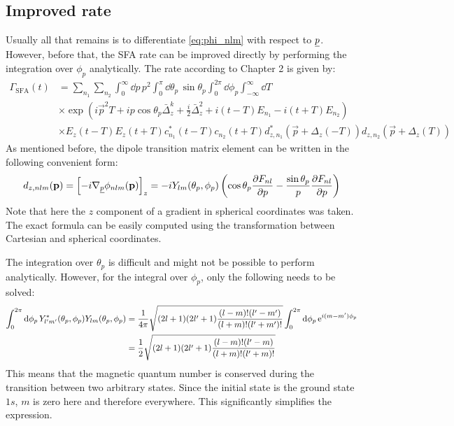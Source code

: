 \subsection*{Improved rate}
Usually all that remains is to differentiate \eqref{eq:phi_nlm} with respect to $\underline{p}$.
However, before that, the SFA rate can be improved directly by performing the integration over $\phi_p$ analytically.
The rate according to Chapter 2 is given by:
\begin{align*}
    \Gamma_{\mathrm{SFA}}(t) &= \sum_{n_1}\sum_{n_2} \int_0^{\infty} \dd p\,p^2\int_0^{\pi} \dd\theta_p\,\sin\theta_p \int_0^{2\pi}\dd \phi_p\int_{-\infty}^{\infty} \dd T\\
    &\times \exp\left(i\vec{p}^2T + ip\cos\theta_p\bar{\Delta}_z^k +  \frac{i}{2}\bar{\Delta}_z^2  + i(t-T)E_{n_1}-i(t+T)E_{n_2}\right)\\
    &\times E_z(t-T) E_z(t+T)c_{n_1}^*(t-T)c_{n_2}(t+T) d_{z,n_1}^*(\vec{p}+\Delta_z(-T))d_{z,n_2}(\vec{p}+\Delta_z(T))
\end{align*}
As mentioned before, the dipole transition matrix element can be written in the following convenient form:
\begin{equation*}
    d_{z,nlm}(\mathbf{p}) = \left[-i\nabla_{\underline{p}}\phi_{nlm}(\mathbf{p})\right]_z = -iY_{lm}(\theta_p, \phi_p)\left(\cos\theta_p\frac{\partial F_{nl}}{\partial p}-\frac{\sin\theta_p}{p}\frac{\partial F_{nl}}{\partial p}\right)
\end{equation*}
Note that here the $z$ component of a gradient in spherical coordinates was taken. The exact formula can be easily computed using the transformation between Cartesian and spherical coordinates.

The integration over $\theta_p$ is difficult and might not be possible to perform analytically.
However, for the integral over $\phi_p$, only the following needs to be solved:
\begin{align*}
    \int_{0}^{2\pi}\mathrm{d} \phi_p\, Y_{l'm'}^*(\theta_p, \phi_p) Y_{lm}(\theta_p, \phi_p) &= \frac{1}{4\pi}\sqrt{(2l+1)(2l'+1)\frac{(l-m)!(l'-m')}{(l+m)!(l'+m')!}}\int_{0}^{2\pi}\mathrm{d} \phi_p\, \mathrm{e}^{i(m-m')\phi_p}\\
    &= \frac{1}{2}\sqrt{(2l+1)(2l'+1)\frac{(l-m)!(l'-m)}{(l+m)!(l'+m)!}}
\end{align*}
This means that the magnetic quantum number is conserved during the transition between two arbitrary states.
Since the initial state is the ground state $1s$, $m$ is zero here and therefore everywhere.
This significantly simplifies the expression.






